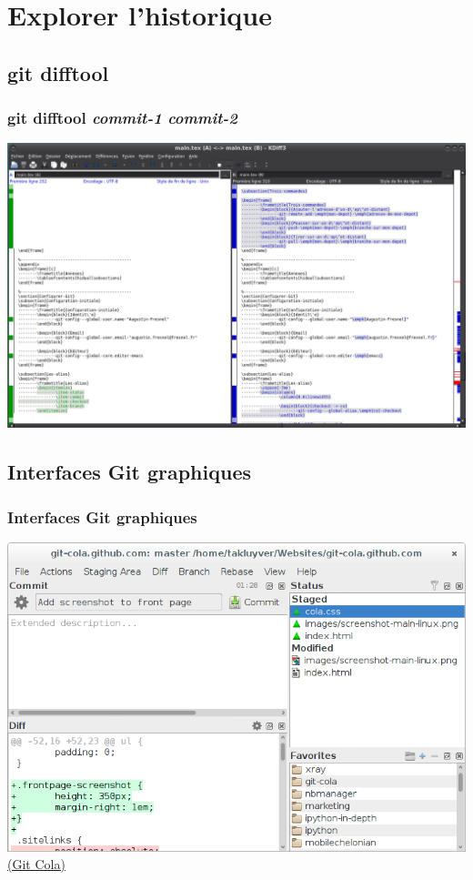 \documentclass[t,11pt]{beamer}
\begin{document}
\section{Explorer l'historique}
\subsection{git difftool}
\begin{frame}
        \frametitle{git difftool \emph{commit-1} \emph{commit-2}}
        \centering
        \includegraphics[width=\linewidth,height=0.8\textheight,keepaspectratio]{./img/git-difftool-kdiff3.png}
\end{frame}

\subsection{Interfaces Git graphiques}
\begin{frame}
        \frametitle{Interfaces Git graphiques}
        \centering
        \vspace{-1mm}
        \includegraphics[width=\linewidth,height=0.8\textheight,keepaspectratio]{./img/git-cola}
        \newline
        \href{https://git-scm.com/download/gui/linux}{{\tiny (Git Cola)}}
        
\end{frame}
\end{document}
